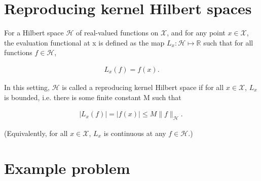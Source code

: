 \documentclass[12pt]{article}
\begin{document}
\section{Reproducing kernel Hilbert spaces}

For a Hilbert space $\mathcal{H}$ of real-valued functions on $\mathcal{X}$, and for any point $x \in \mathcal{X}$, the evaluation functional at x is defined as the map $L_x: \mathcal{H} \mapsto \mathbb{R}$ such that for all functions $f \in \mathcal{H}$,

\begin{align} 
    L_x(f) = f(x). 
\end{align}

In this setting, $\mathcal{H}$ is called a reproducing kernel Hilbert space if for all $x \in \mathcal{X}$, $L_x$ is bounded, i.e. there is some finite constant M such that

\begin{align}
    |L_x(f)| = |f(x)| \leq M \| f \|_\mathcal{H}. \
\end{align}

(Equivalently, for all $x \in \mathcal{X}$, $L_x$ is continuous at any $f \in \mathcal{H}$.)







\section{Example problem}
\end{document}
